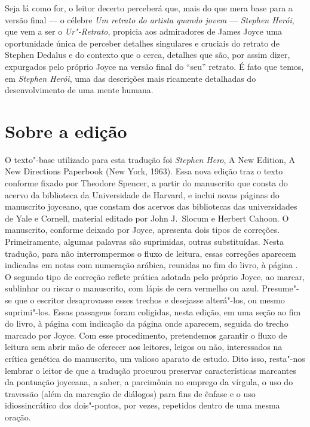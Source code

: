 Seja lá como for, o leitor decerto perceberá que, mais do que mera base
para a versão final --- o célebre \textit{Um retrato do artista quando
jovem} --- \textit{Stephen Herói}, que vem a ser o \textit{Ur"-Retrato},
propicia aos admiradores de James Joyce uma oportunidade única de
perceber detalhes singulares e cruciais do retrato de Stephen Dedalus		
e do contexto que o cerca, detalhes que são, por assim dizer,
expurgados pelo próprio Joyce na versão final do “seu” retrato.  É fato
que temos, em \textit{Stephen Herói}, uma das descrições mais ricamente
detalhadas do desenvolvimento de uma mente humana.


\section*{Sobre a edição}

O texto"-base utilizado para esta tradução foi \textit{Stephen Hero}, A New
Edition, A New Directions Paperbook (New York, 1963).  Essa nova edição traz o
texto conforme fixado por Theodore Spencer, a partir do manuscrito que consta
do acervo da biblioteca da Universidade de Harvard, e inclui novas páginas do
manuscrito joyceano, que constam dos acervos das bibliotecas das universidades
de Yale e Cornell, material editado por John J.~Slocum e Herbert Cahoon.  O
manuscrito, conforme deixado por Joyce, apresenta dois tipos de correções.
Primeiramente, algumas palavras são suprimidas, outras substituídas.  Nesta tradução, 
para não interrompermos o fluxo de leitura, essas correções aparecem indicadas em notas 
com numeração arábica, reunidas no fim do livro, à página \pageref{notas"-arabicas}.  
O segundo tipo de correção reflete prática adotada pelo próprio Joyce, ao marcar, sublinhar ou riscar o
manuscrito, com lápis de cera vermelho ou azul.  Presume"-se que o escritor
desaprovasse esses trechos e desejasse alterá"-los, ou mesmo suprimi"-los.
Essas passagens foram coligidas, nesta edição, em uma seção ao fim do livro, à página \pageref{passagens} 
com indicação da página onde aparecem, seguida do trecho marcado por Joyce. Com esse 
procedimento, pretendemos garantir o fluxo de leitura sem abrir mão de oferecer aos 
leitores, leigos ou não, interessados na crítica genética do manuscrito, um valioso 
aparato de estudo. Dito isso, resta"-nos lembrar o leitor de que a tradução procurou preservar
características marcantes da pontuação joyceana, a saber, a parcimônia no
emprego da vírgula, o uso do travessão (além da marcação de diálogos) para fins
de ênfase e o uso idiossincrático dos dois"-pontos, por vezes, repetidos dentro
de uma mesma oração.



